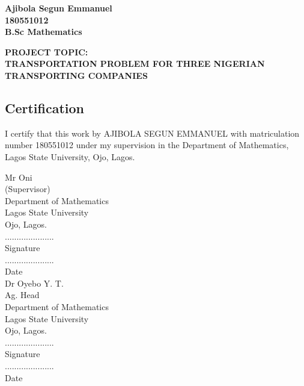 \documentclass{article}
\begin{document}
	\begin{center}
	\Huge\textbf{Ajibola Segun Emmanuel} \\
	\vspace{5mm} %
	\Huge\textbf{180551012} \\
	\vspace{5mm} %
	\Huge\textbf{B.Sc Mathematics} \\ 
	\end{center}
	\vspace{50mm} %
	\begin{center}
	\Large\textbf{PROJECT TOPIC:} \\
	\vspace{5mm} %
	\Huge\textbf{\Huge TRANSPORTATION PROBLEM FOR THREE NIGERIAN TRANSPORTING COMPANIES}\par
	\end{center}

\newpage
\begin{center}
	\subsection{Certification}
\end{center}

I certify that this work by AJIBOLA SEGUN EMMANUEL with matriculation number 180551012 under my supervision in the Department of Mathematics, Lagos State University, Ojo, Lagos.

\vspace{30mm}

\begin{multicols}{2}

\noindent
Mr Oni \\ 
(Supervisor) \\ 
Department of Mathematics \\ 
Lagos State University \\ 
Ojo, Lagos. \\ 

\noindent
..................... \\
Signature \\
..................... \\
Date \\

\noindent
Dr Oyebo Y. T. \\
Ag. Head \\
Department of Mathematics \\
Lagos State University \\
Ojo, Lagos. \\

\noindent
..................... \\
Signature \\
..................... \\
Date \\

\end{multicols}
\end{document}
